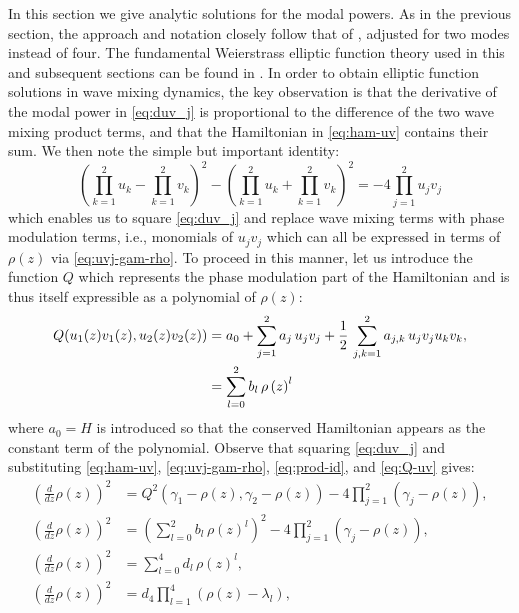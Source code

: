 \documentclass[11pt,a4paper]{article}
\numberwithin{equation}{section}
\begin{document}
In this section we give analytic solutions for the modal powers.
As in the previous section, the approach and notation closely follow that of \cite{heskethCompleteWeierstrassElliptic2026}, adjusted for two modes instead of four.
The fundamental Weierstrass elliptic function theory used in this and subsequent sections can be found in \cite{whittakerCourseModernAnalysis2021}. 
In order to obtain elliptic function solutions in wave mixing dynamics, the key observation is that the derivative of the modal power in \eqref{eq:duv_j} is proportional to the difference of the two wave mixing product terms, and that the Hamiltonian in \eqref{eq:ham-uv} contains their sum.
We then note the simple but important identity:
\begin{equation}
\label{eq:prod-id}
\left(\prod\limits_{k=1}^{2} u_k - \prod\limits_{k=1}^{2} v_k\right)^2 - \left(\prod\limits_{k=1}^{2} u_k + \prod\limits_{k=1}^{2} v_k\right)^2 = - 4 \prod\limits_{j=1}^{2} u_j v_j
\end{equation}
which enables us to square \eqref{eq:duv_j} and replace wave mixing terms with phase modulation terms, i.e., monomials of $u_j v_j$ which can all be expressed in terms of $\rho(z)$ via \eqref{eq:uvj-gam-rho}.
To proceed in this manner, let us introduce the function $Q$ which represents the phase modulation part of the Hamiltonian and is thus itself expressible as a polynomial of $\rho(z)$:
\begin{align}
Q(u_1(z)v_1(z), u_2(z)v_2(z)) &= a_0 + \sum_{j=1}^{2} a_{j}\, u_j v_j + \frac{1}{2}\,\sum_{j,k=1}^{2} a_{j,k}\, u_j v_j u_k v_k , \notag  \\
& = \sum_{l=0}^{2}b_l\,\rho\left(z\right)^l \label{eq:Q-uv}
\end{align}
where $a_0=H$ is introduced so that the conserved Hamiltonian appears as the constant term of the polynomial. Observe that squaring \eqref{eq:duv_j} and substituting \eqref{eq:ham-uv}, \eqref{eq:uvj-gam-rho}, \eqref{eq:prod-id}, and \eqref{eq:Q-uv} gives:
\begin{align}
\left(\frac{d}{d z} \rho{\left(z \right)}\right)^{2} &= Q^{2}{\left({\gamma}_{1} - \rho{\left(z \right)}, {\gamma}_{2}  - \rho{\left(z \right)}\right)} - 4 \prod_{j=1}^{2} \left({\gamma}_{j} - \rho{\left(z \right)}\right), \label{eq:drho-sqrd-1} \\
\left(\frac{d}{d z} \rho{\left(z \right)}\right)^{2} &=  \left(\sum_{l=0}^{2}b_l\,\rho\left(z\right)^l\right)^{2} - 4 \prod_{j=1}^{2} \left({\gamma}_{j} - \rho{\left(z \right)}\right), \label{eq:drho-sqrd-2} \\
\left(\frac{d}{d z} \rho{\left(z \right)}\right)^{2} &= \sum_{l=0}^{4}d_l\,\rho\left(z\right)^l, \label{eq:drho-sqrd-3} \\
\left(\frac{d}{d z} \rho{\left(z \right)}\right)^{2} &= d_4 \prod_{l=1}^{4} \left(\rho\left(z\right) -  \lambda_l\right), \label{eq:drho-sqrd-4}
\end{align}
\end{document}
